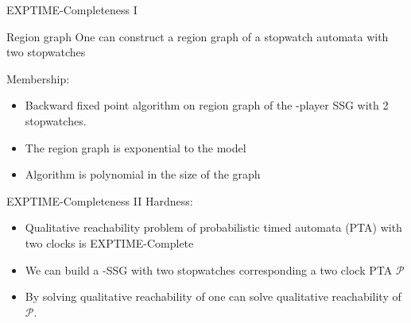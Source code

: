 \documentclass{beamer}
\begin{document}
           \begin{frame}{EXPTIME-Completeness I}
             \begin{block}{Region graph}
               One can construct a region graph
               of a stopwatch automata with two stopwatches
               \end{block}
              Membership:
             \begin{itemize}
             \item Backward fixed point algorithm on region graph of
               the \onehalf-player SSG with 2 stopwatches.
               \item The region graph is exponential to the model
               \item Algorithm is polynomial in the size of the graph
               \end{itemize}
             \end{frame}
             \begin{frame}{EXPTIME-Completeness II}
               Hardness:
               \begin{itemize}
                 \item Qualitative reachability problem of
                   probabilistic timed automata (PTA) with two clocks is
                   EXPTIME-Complete~
                     \item We can build a \onehalf-SSG \stg with two
                       stopwatches corresponding a two clock PTA $\mathcal{P}$
                      \item By solving qualitative reachability of \stg
                        one can solve qualitative reachability of $\mathcal{P}$.
                      \end{itemize}
                    \end{frame}
\end{document}

